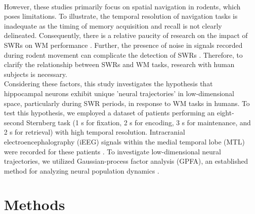\documentclass[final,3p,times,twocolumn]{elsarticle}
\begin{document}
\\
\indent
However, these studies primarily focus on spatial navigation in rodents, which poses limitations. To illustrate, the temporal resolution of navigation tasks is inadequate as the timing of memory acquisition and recall is not clearly delineated. Consequently, there is a relative paucity of research on the impact of SWRs on WM performance \cite{jadhav_awake_2012}. Further, the presence of noise in signals recorded during rodent movement can complicate the detection of SWRs \cite{Watanabe_2021}. Therefore, to clarify the relationship between SWRs and WM tasks, research with human subjects is necessary.
\\
\indent
Considering these factors, this study investigates the hypothesis that hippocampal neurons exhibit unique 'neural trajectories' in low-dimensional space, particularly during SWR periods, in response to WM tasks in humans. To test this hypothesis, we employed a dataset of patients performing an eight-second Sternberg task (1 s for fixation, 2 s for encoding, 3 s for maintenance, and 2 s for retrieval) with high temporal resolution. Intracranial electroencephalography (iEEG) signals within the medial temporal lobe (MTL) were recorded for these patients \cite{boran_dataset_2020}. To investigate low-dimensional neural trajectories, we utilized Gaussian-process factor analysis (GPFA), an established method for analyzing neural population dynamics \cite{yu_gaussian-process_2009}.
\label{sec:introduction}
\section{Methods}
\end{document}
